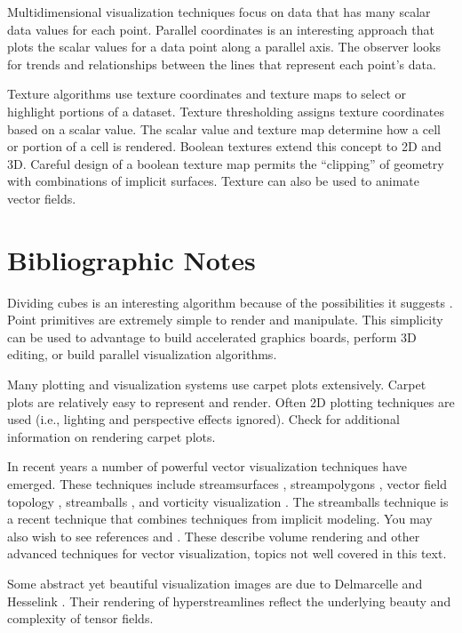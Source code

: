 Multidimensional visualization techniques focus on data that has many scalar data values for each point. Parallel coordinates is an interesting approach that plots the scalar values for a data point along a parallel axis. The observer looks for trends and relationships between the lines that represent each point's data.

Texture algorithms use texture coordinates and texture maps to select or highlight portions of a dataset. Texture thresholding assigns texture coordinates based on a scalar value. The scalar value and texture map determine how a cell or portion of a cell is rendered. Boolean textures extend this concept to 2D and 3D. Careful design of a boolean texture map permits the ``clipping'' of geometry with combinations of implicit surfaces. Texture can also be used to animate vector fields.

\section{ Bibliographic Notes}

Dividing cubes is an interesting algorithm because of the possibilities it suggests \cite{Cline88}. Point primitives are extremely simple to render and manipulate. This simplicity can be used to advantage to build accelerated graphics boards, perform 3D editing, or build parallel visualization algorithms.

Many plotting and visualization systems use carpet plots extensively. Carpet plots are relatively easy to represent and render. Often 2D plotting techniques are used (i.e., lighting and perspective effects ignored). Check \cite{Wang90} for additional information on rendering carpet plots.

In recent years a number of powerful vector visualization techniques have emerged. These techniques include streamsurfaces \cite{Hultquist92}, streampolygons \cite{Schroeder91}, vector field topology \cite{Helman91} \cite{Globus91}, streamballs \cite{Brill94}, and vorticity visualization \cite{Banks94}. The streamballs technique is a recent technique that combines techniques from implicit modeling. You may also wish to see references \cite{Crawfis92} \cite{vanWijk93} and \cite{Max94}. These describe volume rendering and other advanced techniques for vector visualization, topics not well covered in this text.

Some abstract yet beautiful visualization images are due to Delmarcelle and Hesselink \cite{Delmarcelle93}. Their rendering of hyperstreamlines reflect the underlying beauty and complexity of tensor fields.

